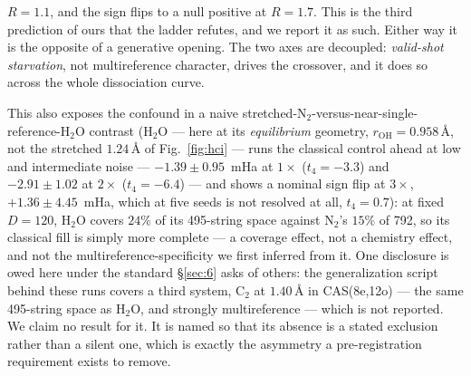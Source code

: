 \documentclass[onecolumn,a4paper]{quantumarticle}
\begin{document}
$R{=}1.1$, and the sign flips to a null positive at $R{=}1.7$. This is the third prediction of ours that the ladder refutes, and we report it as such. Either way it is the opposite of a generative opening. The two axes are decoupled: \emph{valid-shot starvation}, not multireference character, drives the crossover, and it does so across the whole dissociation curve.

This also exposes the confound in a naive stretched-N$_2$-versus-near-single-reference-H$_2$O contrast (H$_2$O --- here at its \emph{equilibrium} geometry, $r_{\mathrm{OH}}{=}0.958\,$\AA{}, not the stretched $1.24\,$\AA{} of Fig.~\ref{fig:hci} --- runs the classical control ahead at low and intermediate noise --- $-1.39\pm0.95$~mHa at $1\times$ ($t_4{=}-3.3$) and $-2.91\pm1.02$ at $2\times$ ($t_4{=}-6.4$) --- and shows a nominal sign flip at $3\times$, $+1.36\pm4.45$~mHa, which at five seeds is not resolved at all, $t_4{=}0.7$): at fixed $D{=}120$, H$_2$O covers $24\%$ of its 495-string space against N$_2$'s $15\%$ of 792, so its classical fill is simply more complete --- a coverage effect, not a chemistry effect, and not the multireference-specificity we first inferred from it. One disclosure is owed here under the standard \S\ref{sec:6} asks of others: the generalization script behind these runs covers a third system, C$_2$ at $1.40\,$Å in CAS(8e,12o) --- the same 495-string space as H$_2$O, and strongly multireference --- which is not reported. We claim no result for it. It is named so that its absence is a stated exclusion rather than a silent one, which is exactly the asymmetry a pre-registration requirement exists to remove.
\end{document}
